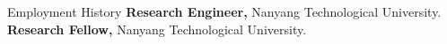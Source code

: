 \begin{rubric}{Employment History}
\entry*[2025.4 -- 2025.9]%
	\textbf{Research Engineer,} Nanyang Technological University.
%
	\textbf{Research Fellow,} Nanyang Technological University.
\end{rubric}